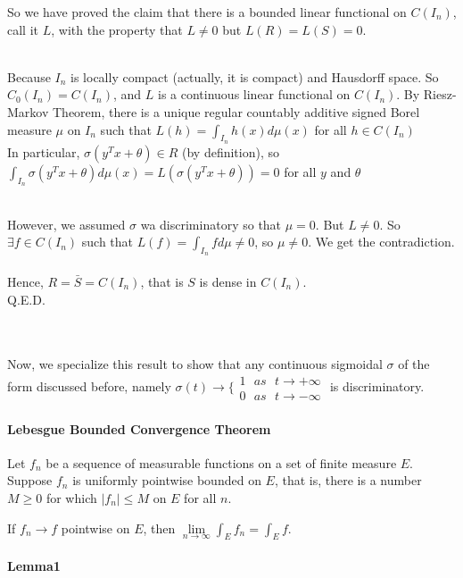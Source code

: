 So we have proved the claim that there is a bounded linear functional on $C(I_n)$, call it $L$, with the property that $L\neq 0$ but $L(R)=L(S)=0$.

~\\Because $I_n$ is locally compact (actually, it is compact) and Hausdorff space. So $C_0(I_n)=C(I_n)$, and $L$ is a continuous linear functional on $C(I_n)$. By Riesz-Markov Theorem, there is a unique regular countably additive signed Borel measure $\mu$ on $I_n$ such that $L(h)=\int_{I_n}h(x)d\mu(x)$ for all $h\in C(I_n)$
~\\In particular, $\sigma(y^Tx+\theta)\in R$ (by definition), so $\int_{I_n}\sigma(y^Tx+\theta)d\mu(x)=L(\sigma(y^Tx+\theta))=0$ for all $y$ and $\theta$

~\\However, we assumed $\sigma$ wa discriminatory so that $\mu=0$. But $L\neq0$. So $\exists f\in C(I_n)$ such that $L(f)=\int_{I_n}fd\mu\neq0$, so $\mu\neq0$. We get the contradiction.
~\\Hence, $R=\bar{S}=C(I_n)$, that is $S$ is dense in $C(I_n)$.
~\\ Q.E.D.

~\\~\\Now, we specialize this result to show that any continuous sigmoidal $\sigma$ of the form discussed before, namely
$\sigma(t)\rightarrow \Big\{
\begin{aligned}
1  \ \ \ as \ \ \ t\rightarrow + \infty \\
0  \ \ \ as \ \ \ t\rightarrow - \infty
\end{aligned}$
is discriminatory.
\paragraph{Lebesgue Bounded Convergence Theorem}

Let ${f_n}$ be a sequence of measurable functions on a set of finite measure $E$. Suppose ${f_n}$ is uniformly pointwise bounded on $E$, that is, there is a number $M\ge0$ for which $|f_n|\le M$ on $E$ for all $n$.

If $f_n\rightarrow f$ pointwise on $E$, then $\mathop{lim}\limits_{n\rightarrow\infty}\int_Ef_n=\int_Ef$.
\paragraph{Lemma1}

